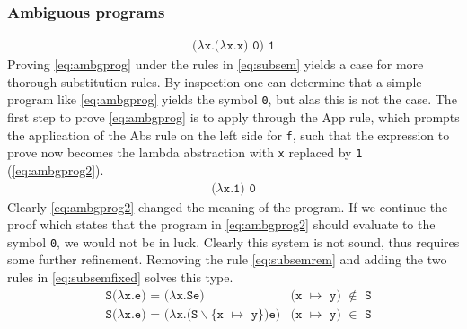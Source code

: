 \documentclass[11pt,oneside,a4paper]{report}
\begin{document}
\subsubsection{Ambiguous programs}
\begin{align}
  \texttt{($\lambda$x.($\lambda$x.x) 0) 1} \label{eq:ambgprog}
\end{align}
Proving \autoref{eq:ambgprog} under the rules in \autoref{eq:subsem} yields a case for more thorough substitution rules.
By inspection one can determine that a simple program like \autoref{eq:ambgprog} yields the symbol \texttt{0}, but alas this is not the case.
The first step to prove \autoref{eq:ambgprog} is to apply through the App rule, which prompts the application of the Abs rule on the left side for \texttt{f}, such that the expression to prove now becomes the lambda abstraction with \texttt{x} replaced by \texttt{1} (\autoref{eq:ambgprog2}).
\begin{align}
  \texttt{($\lambda$x.1) 0} \label{eq:ambgprog2}
\end{align}
Clearly \autoref{eq:ambgprog2} changed the meaning of the program.
If we continue the proof which states that the program in \autoref{eq:ambgprog2} should evaluate to the symbol \texttt{0}, we would not be in luck.
Clearly this system is not sound, thus requires some further refinement.
Removing the rule \autoref{eq:subsemrem} and adding the two rules in \autoref{eq:subsemfixed} solves this type.
\begin{align}
  &\texttt{S($\lambda$x.e) = ($\lambda$x.Se)} & \texttt{(x $\mapsto$ y) $\notin$ S} \label{eq:subsemfixed}\\
  &\texttt{S($\lambda$x.e) = ($\lambda$x.(S$\backslash$\{x $\mapsto$ y\})e)} & \texttt{(x $\mapsto$ y) $\in$ S} \tag*{}
\end{align}
\end{document}
